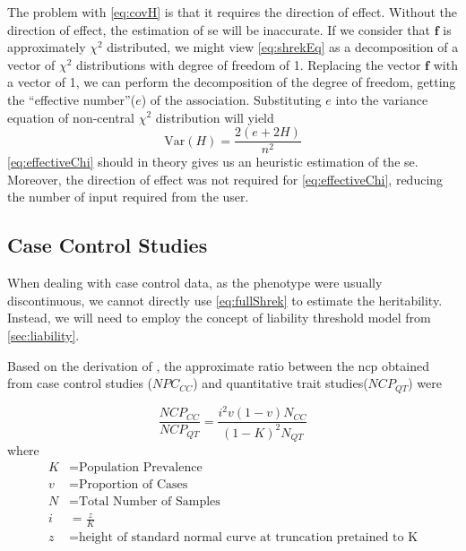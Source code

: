			The problem with \cref{eq:covH} is that it requires the direction of effect. 
			Without the direction of effect, the estimation of \gls{se} will be inaccurate. 
			If we consider that $\boldsymbol{f}$ is approximately $\chi^2$ distributed, we might view \cref{eq:shrekEq} as a decomposition of a vector of $\chi^2$ distributions with degree of freedom of 1. 
			Replacing the vector $\boldsymbol{f}$ with a vector of 1, we can perform the decomposition of the degree of freedom, getting the ``effective number''($e$) of the association\citep{Li2011}. 
			Substituting $e$ into the variance equation of non-central $\chi^2$ distribution will yield
			\begin{equation}
			\mathrm{Var}(H) = \frac{2(e+2H)}{n^2}
			\label{eq:effectiveChi}
			\end{equation}
			\cref{eq:effectiveChi} should in theory gives us an heuristic estimation of the \gls{se}. 
			Moreover, the direction of effect was not required for \cref{eq:effectiveChi}, reducing the number of input required from the user.
		\subsection{Case Control Studies}	 
			When dealing with case control data, as the phenotype were usually discontinuous, we cannot directly use \cref{eq:fullShrek} to estimate the heritability.
			Instead, we will need to employ the concept of liability threshold model from \cref{sec:liability}. 
			
			Based on the derivation of \citet{Yang2010}, the approximate ratio between the \gls{ncp} obtained from case control studies ($NPC_{CC}$) and quantitative trait studies($NCP_{QT}$) were
		
			\begin{equation}
			\frac{NCP_{CC}}{NCP_{QT}} = \frac{i^2v(1-v)N_{CC}}{(1-K)^2N_{QT}}
			\label{eq:originNCPTransform}
			\end{equation}
			where
			\begin{align*}
			 K &= \text{Population Prevalence} \\
			 v &= \text{Proportion of Cases}\\
			 N &= \text{Total Number of Samples}\\
			 i &= \frac{z}{K}\\
			 z &= \text{height of standard normal curve at truncation pretained to K}
			\end{align*}
			
